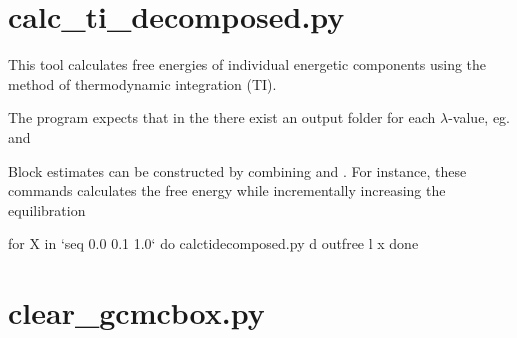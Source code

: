 \documentclass[letterpaper,10pt,english]{sphinxmanual}
\begin{document}
\section{calc\_ti\_decomposed.py}
\label{\detokenize{tools:calc-ti-decomposed-py}}

%
\begin{sphinxVerbatim}[commandchars=\\\{\}]
  
      
     
    
\end{sphinxVerbatim}


This tool calculates free energies of individual energetic components using the method of thermodynamic integration (TI).

The program expects that in the  there exist an output folder for each \(\lambda\)-value, eg.  and 

Block estimates can be constructed by combining  and . For instance, these commands calculates the free energy while incrementally increasing the equilibration

%
\begin{sphinxVerbatim}[commandchars=\\\{\}]
for X in {}`seq 0.0 0.1 1.0{}`
do
calc\PYGZus{}ti\PYGZus{}decomposed.py \PYGZhy{}d out\PYGZus{}free \PYGZhy{}l \PYGZdl{}x
done
\end{sphinxVerbatim}


\section{clear\_gcmcbox.py}
\label{\detokenize{tools:clear-gcmcbox-py}}
\end{document}
